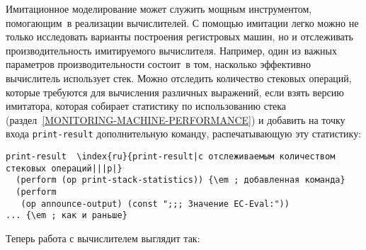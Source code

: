 Имитационное моделирование может служить мощным
инструментом, помогающим~в реализации вычислителей.  С помощью
имитации легко можно не только исследовать варианты построения
регистровых машин, но и отслеживать производительность имитируемого
вычислителя.  Например, один из важных параметров производительности
состоит~в том, насколько эффективно вычислитель использует стек.
Можно отследить количество стековых операций, которые требуются для
вычисления различных выражений, если взять версию имитатора, которая
собирает статистику по использованию стека 
(раздел~\ref{MONITORING-MACHINE-PERFORMANCE}) и добавить
на точку входа {\tt print-result} дополнительную команду,
распечатывающую эту статистику:

\begin{Verbatim}[fontsize=\small]
print-result  \index{ru}{print-result|с отслеживаемым количеством стековых операций|||p|}
  (perform (op print-stack-statistics)) {\em ; добавленная команда}
  (perform
   (op announce-output) (const ";;; Значение EC-Eval:"))
... {\em ; как и раньше}
\end{Verbatim}
Теперь работа с вычислителем выглядит так:


